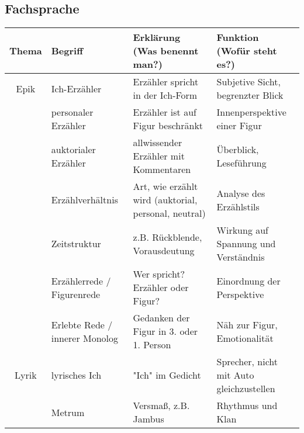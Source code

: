 
\subsection{Fachsprache}
\setlength{\tabcolsep}{4pt}

\renewcommand{\arraystretch}{1.3}
\begin{tabularx}{\textwidth}{|c|p{2.5cm}|X|X|}
    \hline
    Thema & Begriff & Erklärung (Was benennt man?) & Funktion (Wofür steht es?) \\
    \hline
    \hline
    Epik & Ich-Erzähler & Erzähler spricht in der Ich-Form & Subjetive Sicht, begrenzter Blick \\
    \hline 
    & personaler Erzähler & Erzähler ist auf Figur beschränkt & Innenperspektive einer Figur \\
    \hline 
    & auktorialer Erzähler & allwissender Erzähler mit Kommentaren & Überblick, Leseführung \\
    \hline
    & Erzählverhältnis & Art, wie erzählt wird (auktorial, personal, neutral) & Analyse des Erzählstils \\
    \hline
    & Zeitstruktur & z.B. Rückblende, Vorausdeutung & Wirkung auf Spannung und Verständnis \\
    \hline
    & Erzählerrede / Figurenrede & Wer spricht? Erzähler oder Figur? & Einordnung der Perspektive \\
    \hline
    & Erlebte Rede / innerer Monolog & Gedanken der Figur in 3. oder 1. Person & Näh zur Figur, Emotionalität \\
    \hline
    Lyrik & lyrisches Ich & "Ich" im Gedicht & Sprecher, nicht mit Auto gleichzustellen \\
    \hline
    & Metrum & Versmaß, z.B. Jambus & Rhythmus und Klan \\
    \hline
    
    \hline
\end{tabularx}
